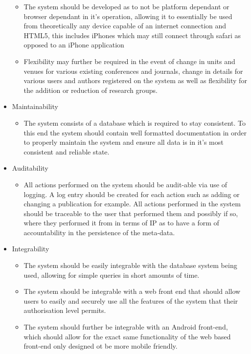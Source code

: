 \documentclass{article}
\begin{document}
\begin{itemize}
\begin{itemize}
				\item The system should be developed as to not be platform dependant or browser dependant in it's operation, allowing it to essentially be used from theoretically any device capable of an internet connection and HTML5, this includes iPhones which may still connect through safari as opposed to an iPhone application
				\item Flexibility may further be required in the event of change in units and venues for various existing conferences and journals, change in details for various users and authors registered on the system as well as flexibility for the addition or reduction of research groups.
			\end{itemize}
			\item Maintainability
			\begin{itemize}
				\item The system consists of a database which is required to stay consistent. To this end the system should contain well formatted documentation in order to properly maintain the system and ensure all data is in it's most consistent and reliable state.
			\end{itemize}
			\item Auditability
			\begin{itemize}
				\item All actions performed on the system should be audit-able via use of logging. A log entry should be created for each action such as adding or changing a publication for example. All actions performed in the system should be traceable to the user that performed them and possibly if so, where they performed it from in terms of IP as to have a form of accountability in the persistence of the meta-data.
			\end{itemize}
			\item Integrability
			\begin{itemize}
				\item The system should be easily integrable with the database system being used, allowing for simple queries in short amounts of time.
				\item The system should be integrable with a web front end that should allow users to easily and securely use all the features of the system that their authorisation level permits.
				\item The system should further be integrable with an Android front-end, which should allow for the exact same functionality of the web based front-end only designed ot be more mobile friendly.

\end{itemize}
\end{itemize}
\end{document}
